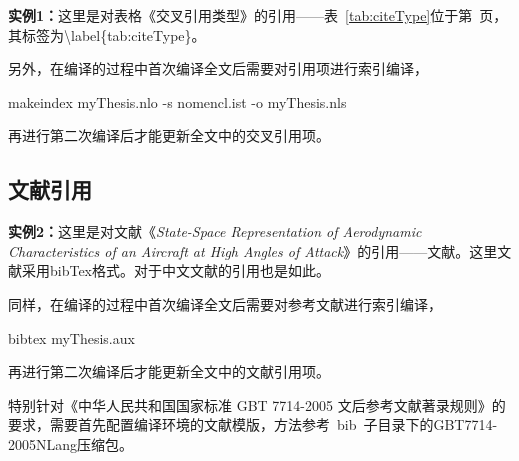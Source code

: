 {\bf{实例1：}}这里是对表格《交叉引用类型》的引用——表~\ref{tab:citeType}位于第~\pageref{tab:citeType}页，其标签为\textbackslash label\{tab:citeType\}。

另外，在编译的过程中首次编译全文后需要对引用项进行索引编译，

\begin{center}
  {\color{blue}makeindex myThesis.nlo -s nomencl.ist -o myThesis.nls}
\end{center}

再进行第二次编译后才能更新全文中的交叉引用项。

\subsection{文献引用}
\label{sec:citeRefs}

{\bf{实例2：}}这里是对文献《{\it{State-Space Representation of Aerodynamic Characteristics of an Aircraft at High Angles of Attack}}》的引用——文献\cite{Goman:state_aerodynamics}。这里文献采用bibTex格式。对于中文文献的引用也是如此\cite{BUAA:2002-CFD-missile}。

同样，在编译的过程中首次编译全文后需要对参考文献进行索引编译，

\begin{center}
  {\color{blue}bibtex myThesis.aux}
\end{center}

再进行第二次编译后才能更新全文中的文献引用项。

特别针对《中华人民共和国国家标准 GBT 7714-2005 文后参考文献著录规则》的要求，需要首先配置编译环境的文献模版，方法参考~bib~子目录下的GBT7714-2005NLang压缩包。
